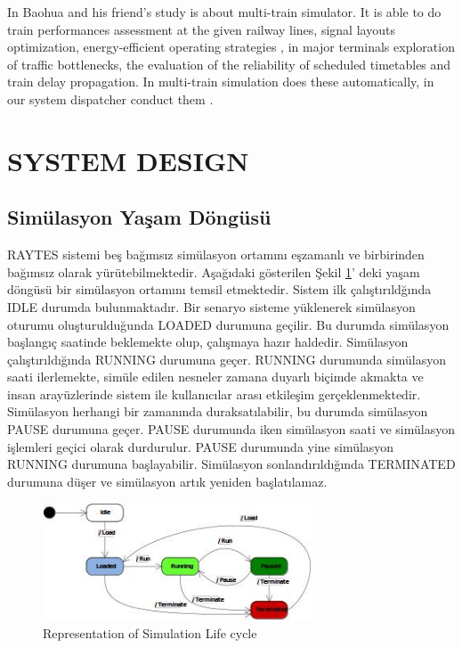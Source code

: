 \documentclass[conference]{IEEEtran}
\begin{document}
 


In Baohua  and his friend's study is about  multi-train simulator. It is able to do  train performances assessment at the given railway lines, signal layouts optimization, energy-efficient operating strategies , in major terminals exploration of traffic bottlenecks, the evaluation of the reliability of scheduled timetables and train delay propagation. In multi-train simulation does these automatically, in our system dispatcher conduct them \cite{ICVES}.




\section{SYSTEM DESIGN}
\subsection{Simülasyon Yaşam Döngüsü}

RAYTES sistemi beş bağımsız simülasyon ortamını eşzamanlı ve birbirinden bağımsız olarak yürütebilmektedir. Aşağıdaki gösterilen Şekil \ref{fig:simyasamdongusu}' deki yaşam döngüsü bir simülasyon ortamını temsil etmektedir. Sistem ilk çalıştırıldğında IDLE durumda bulunmaktadır. Bir senaryo sisteme yüklenerek simülasyon oturumu oluşturulduğunda LOADED durumuna geçilir. Bu durumda simülasyon başlangıç saatinde beklemekte olup, çalışmaya hazır haldedir. Simülasyon çalıştırıldığında RUNNING durumuna geçer. RUNNING durumunda simülasyon saati ilerlemekte, simüle edilen nesneler zamana duyarlı biçimde akmakta ve insan arayüzlerinde sistem ile kullanıcılar arası etkileşim gerçeklenmektedir. Simülasyon herhangi bir zamanında duraksatılabilir, bu durumda simülasyon PAUSE durumuna geçer. PAUSE durumunda iken simülasyon saati ve simülasyon işlemleri geçici olarak durdurulur. PAUSE durumunda yine simülasyon RUNNING durumuna başlayabilir. Simülasyon sonlandırıldığında TERMINATED durumuna düşer ve simülasyon artık yeniden başlatılamaz.




\begin{figure}[h!]
  \centering
  \includegraphics[width=8cm]{simyasamdongusu.jpg}
  \caption{Representation of Simulation Life cycle}\label{fig:simyasamdongusu}
\end{figure}
\end{document}
